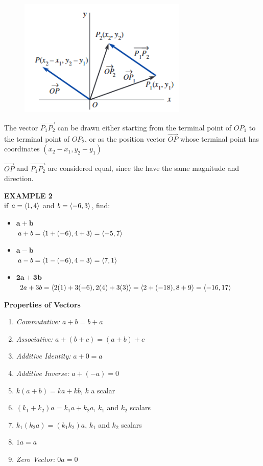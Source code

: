 \documentclass{article}
\DeclareRobustCommand{\qdist}[1]{\ifmmode\langle#1\rangle\else\textlangle#1\textrangle\fi}
\begin{document}
\begin{figure}[H]
  \includegraphics[width=8cm]{images/figure9.PNG}
  \centering
\end{figure}

The vector \(\overrightarrow{P_1 P_2}\) can be drawn either starting from the terminal point of \(OP_1\) to the terminal point of \(OP_2\), or as the position vector $\overrightarrow{OP}$ whose terminal point has coordinates $(x_2 - x_1, y_2 - y_1)$\vspace{0.5cm}

$\overrightarrow{OP}$ and $\overrightarrow{P_1 P_2}$ are considered equal, since the have the same magnitude and direction.\vspace{0.5cm}

\textbf{EXAMPLE 2}\\

if $a = \qdist{1,4}$ and $b = \qdist{-6,3}$, find:\\

\begin{itemize}
  \item $\mathbf{a+b}$\\
    $a + b =  \qdist{1 + (-6), 4 + 3} = \qdist{-5 , 7} $ 
  \item $\mathbf{a-b}$\\
    $a - b = \qdist{1 - (-6), 4 - 3} = \qdist{7 , 1}$
  \item $\mathbf{2a + 3b}$\\
    $2a + 3b = \qdist{2(1) + 3(-6),2(4) + 3(3)} = \qdist{2 + (-18), 8 + 9} = \qdist{-16,17} $
\end{itemize}

\textbf{Properties of Vectors}

\begin{enumerate}[label=(\roman*)]
  \item \textit{Commutative:} \(a + b = b+ a\)
  \item \textit{Associative:} \(a + (b + c) = (a + b) + c\)
  \item \textit{Additive Identity:} \(a + 0 = a\)
  \item \textit{Additive Inverse:} \(a + (-a) = 0\)
  \item \(k(a + b) = ka + kb\), $k$ a scalar
  \item \((k_1 + k_2)a = k_1 a + k_2 a\), $k_1$ and $k_2$ scalars
  \item \(k_1(k_2 a) = (k_1 k_2)a\), $k_1$ and $k_2$ scalars
  \item $1a = a$
  \item \textit{Zero Vector:} $0a = 0$ 
\end{enumerate}
\end{document}
